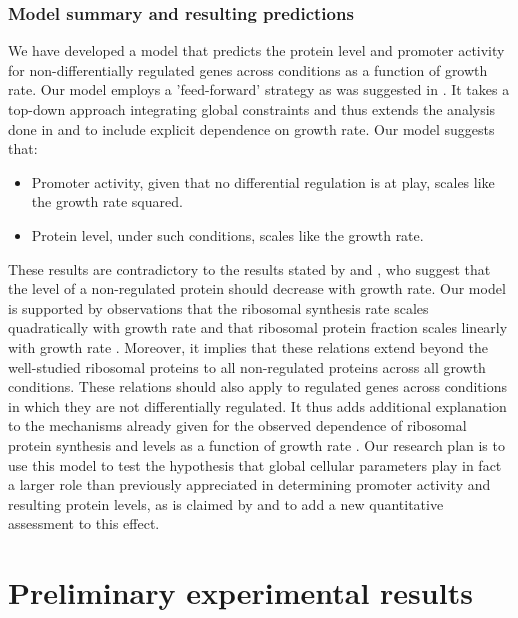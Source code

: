 \documentclass[a4page,notitlepage]{article}
\begin{document}
\subsubsection{Model summary and resulting predictions}
We have developed a model that predicts the protein level and promoter activity for non-differentially regulated genes across conditions as a function of growth rate.
Our model employs a 'feed-forward' strategy as was suggested in \parencite{Levy2009}.
It takes a top-down approach integrating global constraints and thus extends the analysis done in \parencite{Leeat2013} and \parencite{Maaloe1969} to include explicit dependence on growth rate.
Our model suggests that:
\begin{itemize}
\item Promoter activity, given that no differential regulation is at play, scales like the growth rate squared.
\item Protein level, under such conditions, scales like the growth rate.
\end{itemize}
These results are contradictory to the results stated by \parencite{Klumpp2009a} and \parencite{Scott2010b}, who suggest that the level of a non-regulated protein should decrease with growth rate.
Our model is supported by observations that the ribosomal synthesis rate scales quadratically with growth rate \parencite{Zaslaver2009a} and that ribosomal protein fraction scales linearly with growth rate \parencite{Maaloe1969,ingraham1983growth}.
Moreover, it implies that these relations extend beyond the well-studied ribosomal proteins to all non-regulated proteins across all growth conditions.
These relations should also apply to regulated genes across conditions in which they are not differentially regulated.
It thus adds additional explanation to the mechanisms already given for the observed dependence of ribosomal protein synthesis and levels as a function of growth rate \parencite{Zaslaver2009a}.
Our research plan is to use this model to test the hypothesis that global cellular parameters play in fact a larger role than previously appreciated in determining promoter activity and resulting protein levels, as is claimed by \parencite{Berthoumieux2013,Leeat2013,loven2012,Scott2010b,Klumpp2009a} and to add a new quantitative assessment to this effect.
\section{Preliminary experimental results}
\end{document}
